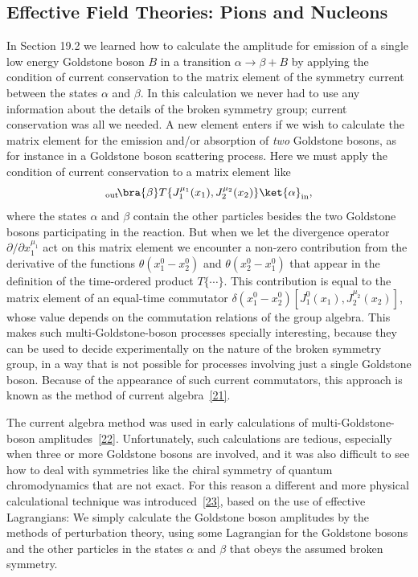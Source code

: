 
\subsection{Effective Field Theories: Pions and Nucleons}
\label{sec:19.5}

In Section 19.2 we learned how to calculate the amplitude for emission of a single low energy Goldstone boson $B$ in a transition $\alpha\to\beta+B$ by applying the condition of current conservation to the matrix element of the symmetry current between the states $\alpha$ and $\beta$. In this calculation we never had to use any information about the details of the broken symmetry group; current conservation was all we needed. A new element enters if we wish to calculate the matrix element for the emission and/or absorption of \emph{two} Goldstone bosons, as for instance in a Goldstone boson scattering process. Here we must apply the condition of current conservation to a matrix element like
\[
{}_{\mathrm{out}}\!\bra{\beta}
T\{J_1^{\mu_1}(x_1),J_2^{\mu_2}(x_2)\}
\ket{\alpha}_{\mathrm{in}},
\]
where the states $\alpha$ and $\beta$ contain the other particles besides the two Goldstone bosons participating in the reaction. But when we let the divergence operator $\partial/\partial x_1^{\mu_1}$ act on this matrix element we encounter a non-zero contribution from the derivative of the functions $\theta(x_1^0-x_2^0)$ and $\theta(x_2^0-x_1^0)$ that appear in the definition of the time-ordered product $T\{\cdots\}$. This contribution is equal to the matrix element of an equal-time commutator $\delta(x_1^0-x_2^0)[J_1^0(x_1),J_2^{\mu_2}(x_2)]$, whose value depends on the commutation relations of the group algebra. This makes such multi-Goldstone-boson processes specially interesting, because they can be used to decide experimentally on the nature of the broken symmetry group, in a way that is not possible for processes involving just a single Goldstone boson. Because of the appearance of such current commutators, this approach is known as the method of current algebra~\hyperref[ch19-ref-21]{[21]}.

The current algebra method was used in early calculations of multi-Goldstone-boson amplitudes~\hyperref[ch19-ref-22]{[22]}. Unfortunately, such calculations are tedious, especially when three or more Goldstone bosons are involved, and it was also difficult to see how to deal with symmetries like the chiral symmetry of quantum chromodynamics that are not exact. For this reason a different and more physical calculational technique was introduced~\hyperref[ch19-ref-23]{[23]}, based on the use of effective Lagrangians: We simply calculate the Goldstone boson amplitudes by the methods of perturbation theory, using some Lagrangian for the Goldstone bosons and the other particles in the states $\alpha$ and $\beta$ that obeys the assumed broken symmetry.


